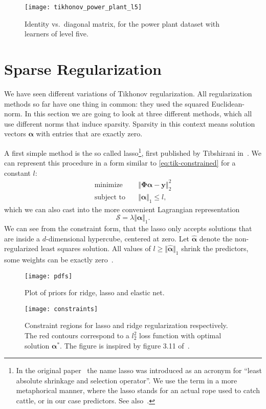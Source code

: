 \begin{figure}[htb]
  \centering
  \texttt{[image: tikhonov\_power\_plant\_l5]}
  \caption{Identity vs.~diagonal matrix, for the power plant dataset with
    learners of level five.}
  \label{fig:tikhonov-power-plant-l5}
\end{figure}
\FloatBarrier{}
\section{Sparse Regularization}
We have seen different variations of Tikhonov regularization.
All regularization methods so far have one thing in common: they used the squared Euclidean-norm.
In this section we are going to look at three different methods, which all use different norms that induce sparsity.
Sparsity in this context means solution vectors \(\bm{\alpha}\) with entries
that are exactly zero.

A first simple method is the so called lasso\footnote{In the original
  paper~\cite{lasso} the name lasso  was introduced as an
  acronym for ``least absolute shrinkage and selection operator''.
We use the term in a more metaphorical manner, where the lasso stands for an
actual rope used to catch cattle, or in our case predictors. See also~\cite{sparse-learning}.},
first published by Tibshirani in~\cite{lasso}.
We can represent this procedure in a form similar to \cref{eq:tik-constrained} for a constant \(l\):
\begin{align}\label{eq:lasso-constrained}
\text{minimize} \quad &
 \left\Vert  \bm{\Phi} \bm{\alpha} - \bm{y}  \right\Vert_2^2 \\
\text{subject to} \quad & \Vert \bm{\alpha}  \Vert_1 \leq l,
\end{align}
which we can also cast into the more convenient Lagrangian representation
\begin{equation*}
\mathcal{S} = \lambda \Vert \bm{\alpha} \Vert_1.
\end{equation*}
We can see from the constraint form, that the lasso only accepts solutions that
are inside a \(d\)-dimensional hypercube, centered at zero.
Let \(\hat{\bm{\alpha}}\) denote the non-regularized least squares solution.
All values of \(l \geq \Vert \hat{\bm{\alpha}} \Vert_1\) shrink the predictors,
some weights can be exactly zero~\cite{lasso}.

\begin{figure}[tb]
    \centering
    \texttt{[image: pdfs]}
    \caption{Plot of priors for ridge, lasso and elastic net.}\label{fig:reg-pdfs}
\end{figure}
\begin{figure}[tb]
    \centering
    \texttt{[image: constraints]}
    \caption{Constraint regions for lasso and ridge regularization respectively. The red contours correspond
      to a \(l_2^2\) loss function with optimal solution \(\bm{\alpha}^*\). The
      figure is inspired by figure 3.11 of~\cite{esl}.}
\end{figure}

